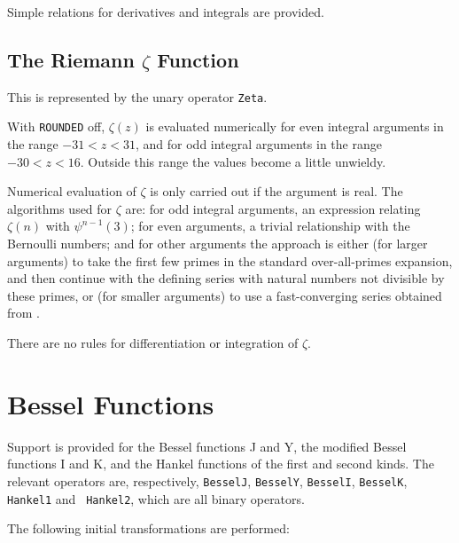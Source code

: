 Simple relations for derivatives and integrals are provided.


\subsection{The Riemann $\zeta$ Function}

This is represented by the unary operator {\tt Zeta}.

With {\tt ROUNDED} off, $\zeta(z)$ is evaluated numerically for even
integral arguments in the range $-31 < z < 31$, and for odd integral
arguments in the range $-30 < z < 16$.  Outside this range the values
become a little unwieldy.

Numerical evaluation of $\zeta$ is only carried out if the argument is real.
The algorithms used for $\zeta$ are: for odd integral arguments, an
expression relating $\zeta(n)$ with $\psi^{n-1}(3)$; for even arguments, a
trivial relationship with the Bernoulli numbers; and for other arguments the
approach is either (for larger arguments) to take the first few primes in
the standard over-all-primes expansion, and then continue with the defining
series with natural numbers not divisible by these primes, or (for smaller
arguments) to use a fast-converging series obtained from \cite{Bender:78}.

There are no rules for differentiation or integration of $\zeta$.


\section{Bessel Functions}

Support is provided for the Bessel functions J and Y, the modified
Bessel functions I and K, and the Hankel functions of the first and
second kinds.  The relevant operators are, respectively, {\tt BesselJ},
{\tt BesselY}, {\tt BesselI}, {\tt BesselK}, {\tt Hankel1} and {\tt
Hankel2}, which are all binary operators.

The following initial transformations are performed:

